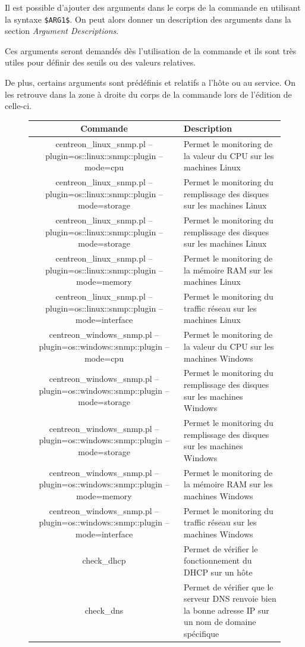 		Il est possible d'ajouter des arguments dans le corps de la commande en utilisant la syntaxe \texttt{\$ARG1\$}.
		On peut alors donner un description des arguments dans la section \emph{Argument Descriptions}.

		Ces arguments seront demandés dès l'utilisation de la commande et ils sont très utiles pour définir des seuils ou des valeurs relatives.

		De plus, certains arguments sont prédéfinis et relatifs a l'hôte ou au service.
		On les retrouve dans la zone à droite du corps de la commande lors de l'édition de celle-ci.

		\begin{figure}
			\begin{tabulary}{\textwidth}{|C|L|}
				\hline
				Commande & Description \\
				\hline
				\hline
				centreon\_linux\_snmp.pl --plugin=os::linux::snmp::plugin --mode=cpu & Permet le monitoring de la valeur du CPU sur les machines Linux\\
				\hline
				centreon\_linux\_snmp.pl --plugin=os::linux::snmp::plugin --mode=storage & Permet le monitoring du remplissage des disques sur les machines Linux\\
				\hline
				centreon\_linux\_snmp.pl --plugin=os::linux::snmp::plugin --mode=storage & Permet le monitoring du remplissage des disques sur les machines Linux\\
				\hline
				centreon\_linux\_snmp.pl --plugin=os::linux::snmp::plugin --mode=memory & Permet le monitoring de la mémoire RAM sur les machines Linux\\
				\hline
				centreon\_linux\_snmp.pl --plugin=os::linux::snmp::plugin --mode=interface & Permet le monitoring du traffic réseau sur les machines Linux\\
				\hline
				\hline
				centreon\_windows\_snmp.pl --plugin=os::windows::snmp::plugin --mode=cpu & Permet le monitoring de la valeur du CPU sur les machines Windows\\
				\hline
				centreon\_windows\_snmp.pl --plugin=os::windows::snmp::plugin --mode=storage & Permet le monitoring du remplissage des disques sur les machines Windows\\
				\hline
				centreon\_windows\_snmp.pl --plugin=os::windows::snmp::plugin --mode=storage & Permet le monitoring du remplissage des disques sur les machines Windows\\
				\hline
				centreon\_windows\_snmp.pl --plugin=os::windows::snmp::plugin --mode=memory & Permet le monitoring de la mémoire RAM sur les machines Windows\\
				\hline
				centreon\_windows\_snmp.pl --plugin=os::windows::snmp::plugin --mode=interface & Permet le monitoring du traffic réseau sur les machines Windows\\
				\hline
				\hline
				check\_dhcp & Permet de vérifier le fonctionnement du DHCP sur un hôte\\
				\hline
				check\_dns & Permet de vérifier que le serveur DNS renvoie bien la bonne adresse IP sur un nom de domaine spécifique\\
				\hline


\end{tabulary}
\end{figure}
